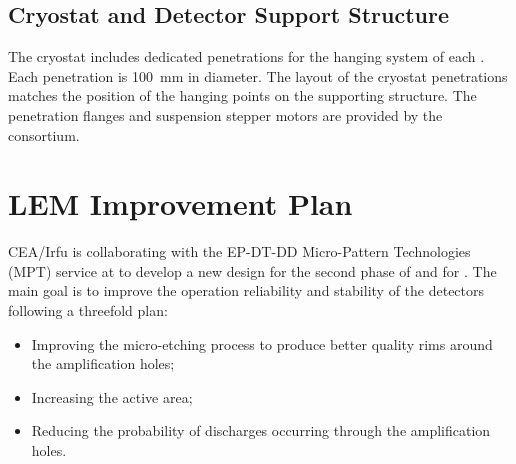 \subsection{Cryostat and Detector Support Structure}
\label{sec:dp-crp-intfc-support}

The cryostat includes dedicated penetrations for the hanging system of each . Each penetration is \SI{100}{mm} in diameter. The layout of the cryostat penetrations matches the position of the hanging points on the  supporting structure. The penetration flanges and  suspension stepper motors are provided by the  consortium.

\section{LEM Improvement Plan}
\label{sec:dp-lem-ip}

CEA/Irfu is collaborating with the EP-DT-DD Micro-Pattern Technologies (MPT) service at  to develop a 
new  design for the second phase of  and for . The main goal is to improve the operation reliability and stability of the  detectors following a threefold plan:
\begin{itemize}
\item Improving the micro-etching process to produce better quality rims around the amplification holes;  
\item Increasing the  active area;
\item Reducing the probability of discharges occurring through the amplification holes.
\end{itemize}

